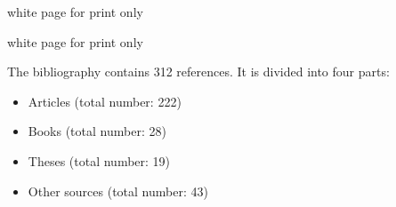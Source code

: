 \documentclass[
							a4paper, 
							11pt, 
							openany, 
							bibtotoc, 
							parskip=half, 
   							headings=normal,
   							bibliography=totoc
						]{scrreprt}
\begin{document}
\newpage

{\color{white} white page for print only}

\newpage





 

 





\thispagestyle{empty}
\tableofcontents
\thispagestyle{empty}
\restoregeometry







\newpage

{\color{white} white page for print only}

\newpage

\setcounter{page}{1}



%
%














\newpage
\thispagestyle{empty}
\mbox{}
\fancyhead[C]{\textsf{  \nouppercase{\leftmark} }}




\printbibheading


The bibliography contains 312 references. It is divided into four parts:

\begin{itemize}
\item Articles (total number: 222)
\item Books (total number: 28)
\item Theses (total number: 19)
\item Other sources (total number: 43)
\end{itemize}
\end{document}
